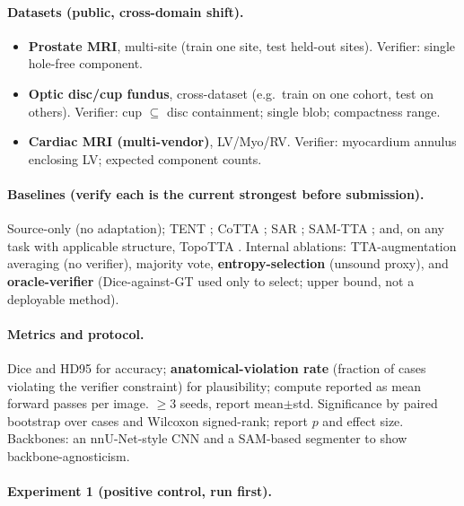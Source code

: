 \documentclass[10pt]{article}
\begin{document}
\paragraph{Datasets (public, cross-domain shift).}
\begin{itemize}\setlength\itemsep{0.15em}
\item \textbf{Prostate MRI}, multi-site (train one site, test held-out sites). Verifier: single hole-free component.
\item \textbf{Optic disc/cup fundus}, cross-dataset (e.g.\ train on one cohort, test on others). Verifier: cup $\subseteq$ disc containment; single blob; compactness range.
\item \textbf{Cardiac MRI (multi-vendor)}, LV/Myo/RV. Verifier: myocardium annulus enclosing LV; expected component counts.
\end{itemize}

\paragraph{Baselines (verify each is the current strongest before submission).} Source-only (no adaptation); TENT \citep{wang2021tent}; CoTTA \citep{wang2022cotta}; SAR \citep{niu2023sar}; SAM-TTA \citep{samtta2026}; and, on any task with applicable structure, TopoTTA \citep{zhou2025topotta}. Internal ablations: TTA-augmentation averaging (no verifier), majority vote, \textbf{entropy-selection} (unsound proxy), and \textbf{oracle-verifier} (Dice-against-GT used only to select; upper bound, not a deployable method).

\paragraph{Metrics and protocol.} Dice and HD95 for accuracy; \textbf{anatomical-violation rate} (fraction of cases violating the verifier constraint) for plausibility; compute reported as mean forward passes per image. $\ge 3$ seeds, report mean$\pm$std. Significance by paired bootstrap over cases \citep{efron1994bootstrap} and Wilcoxon signed-rank; report $p$ and effect size. Backbones: an nnU-Net-style CNN \citep{isensee2021nnunet} and a SAM-based segmenter \citep{kirillov2023sam} to show backbone-agnosticism.

\paragraph{Experiment 1 (positive control, run first).} 
\end{document}

